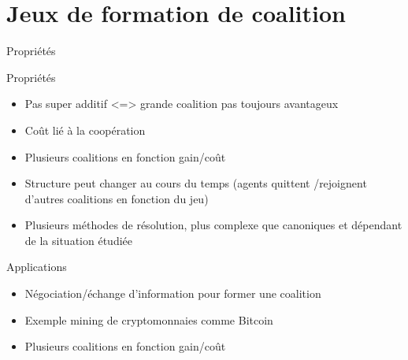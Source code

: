 \documentclass{isimabeamer}
\begin{document}





\section{Jeux de formation de coalition}
\begin{frame}{Propriétés}

\begin{block}{Propriétés}
\begin{itemize}
    \item Pas super additif <=> grande coalition pas toujours avantageux
    \item Coût lié à la coopération
    \item Plusieurs coalitions en fonction gain/coût
    \item Structure peut changer au cours du temps (agents quittent /rejoignent d'autres coalitions en fonction du jeu)
    \item Plusieurs méthodes de résolution, plus complexe que canoniques et dépendant de la situation étudiée
\end{itemize}
\end{block}

\begin{block}{Applications}
\begin{itemize}
    \item Négociation/échange d'information pour former une coalition 
    \item Exemple mining de cryptomonnaies comme Bitcoin
    \item Plusieurs coalitions en fonction gain/coût
\end{itemize}
\end{block}

\end{frame}
\end{document}
